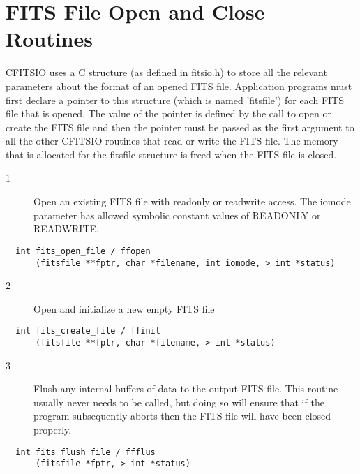 \section{FITS File Open and Close Routines \label{FFOPEN}}

CFITSIO uses a C structure (as defined in fitsio.h) to store all the
relevant parameters about the format of an opened FITS file.
Application programs must first declare a pointer to this structure
(which is named 'fitsfile') for each FITS file that is opened.  The
value of the pointer is defined by the call to open or create the FITS
file and then the pointer must be passed as the first argument to all
the other CFITSIO routines that read or write the FITS file.  The
memory that is allocated for the fitsfile structure is freed when
the FITS file is closed.


\begin{description}
\item[1 ] Open an existing FITS file with readonly or readwrite access.
    The iomode parameter has allowed symbolic constant values of
   READONLY or READWRITE.
\end{description}

\begin{verbatim}
  int fits_open_file / ffopen
      (fitsfile **fptr, char *filename, int iomode, > int *status)
\end{verbatim}

\begin{description}
\item[2 ] Open and initialize a new empty FITS file
\end{description}

\begin{verbatim}
  int fits_create_file / ffinit
      (fitsfile **fptr, char *filename, > int *status)
\end{verbatim}

\begin{description}
\item[3 ]Flush any internal buffers of data to the output FITS file. This
   routine usually never needs to be called, but doing so will ensure
   that if the program subsequently aborts then the FITS file will
  have been closed properly.
\end{description}

\begin{verbatim}
  int fits_flush_file / ffflus
      (fitsfile *fptr, > int *status)
\end{verbatim}

